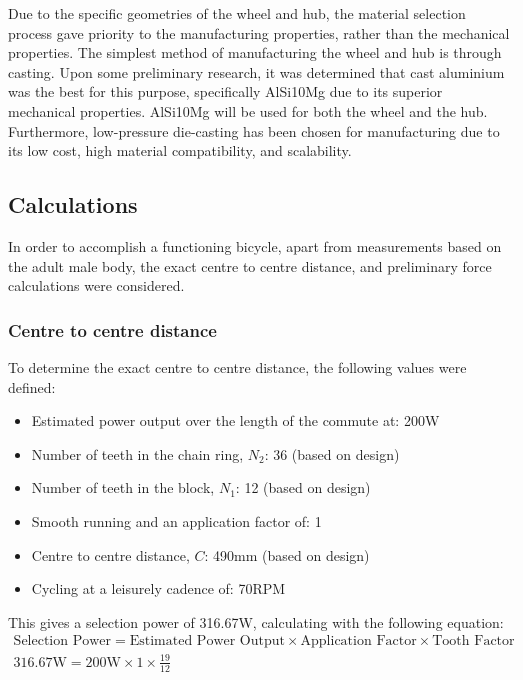 \documentclass[a4paper,11pt]{article}
\begin{document}
Due to the specific geometries of the wheel and hub, the material selection process gave priority to the manufacturing properties, rather than the mechanical properties. The simplest method of manufacturing the wheel and hub is through casting. Upon some preliminary research, it was determined that cast aluminium was the best for this purpose, specifically AlSi10Mg due to its superior mechanical properties. AlSi10Mg will be used for both the wheel and the hub. Furthermore, low-pressure die-casting has been chosen for manufacturing due to its low cost, high material compatibility, and scalability. 

\subsection{Calculations}

In order to accomplish a functioning bicycle, apart from measurements based on the adult male body, the exact centre to centre distance, and preliminary force calculations were considered.

\subsubsection{Centre to centre distance}

To determine the exact centre to centre distance, the following values were defined:

\begin{itemize}
	\setlength{\itemsep}{0pt}
	\item Estimated power output over the length of the commute at: 200W \cite{wilson04} 
	\item Number of teeth in the chain ring, $N_{2}$: 36 (based on design) 
	\item Number of teeth in the block, $N_{1}$: 12 (based on design) 
	\item Smooth running and an application factor of: 1 \hfill\cite{childs04}
	\item Centre to centre distance, $C$: 490mm (based on design) 
	\item Cycling at a leisurely cadence of: 70RPM \hfill\cite{lucia01}
\end{itemize}

This gives a selection power of 316.67W, calculating with the following equation:
\begin{gather*}
	\text{Selection Power}=\text{Estimated Power Output}\times\text{Application Factor}\times\text{Tooth Factor}\\
	316.67\text{W}=200\text{W}\times 1\times \frac{19}{12}
\end{gather*}
\end{document}
